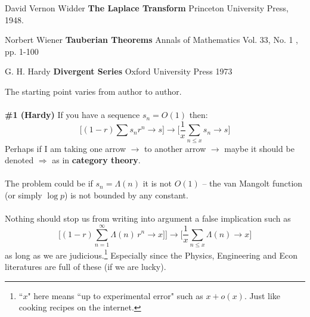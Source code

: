 \documentclass[12pt]{article}
\begin{document}
\selectfont \fontsize{12}{10}\selectfont


\begin{thebibliography}{}

\item David Vernon Widder \textbf{The Laplace Transform} Princeton University Press, 1948.

\item Norbert Wiener \textbf{Tauberian Theorems} Annals of Mathematics Vol. 33, No. 1 , pp. 1-100

\item G. H. Hardy \textbf{Divergent Series} Oxford University Press 1973

\end{thebibliography}

\newpage

\selectfont \fontsize{25}{30}\selectfont

\noindent The starting point varies from author to author. \\ \\
\textbf{\#1 (Hardy)} If you have a sequence $s_n = O(1)$ then:
$$ \Bigg[(1 - r) \sum s_n r^n \to s \Bigg]
\longrightarrow
\Bigg[ \frac{1}{x} \sum_{n \leq x} s_n \to s \Bigg]
 $$
Perhaps if I am taking one arrow $\to$ to another arrow $\to$ maybe it should be denoted $\Rightarrow $ as in \textbf{category theory}. \\ \\
The problem could be if $s_n = \Lambda(n)$ it is not $O(1)$ -- the van Mangolt function (or simply $\log p$) is not bounded by any constant. \\ \\
Nothing should stop us from writing into argument a false implication such as 
$$ \bigg[(1 - r) \sum_{n=1}^\infty \Lambda(n) \,r^n \to x\big] \bigg]
\longrightarrow
\bigg[ \frac{1}{x} \sum_{n \leq x} \Lambda(n) \to x \Bigg]
 $$
as long as we are judicious.\footnote{``$x$" here means ``up to experimental error" such as $x+ o(x)$.  Just like cooking recipes on the internet. }  Especially since the Physics, Engineering and Econ literatures are full of these (if we are lucky). 

\newpage
\end{document}
